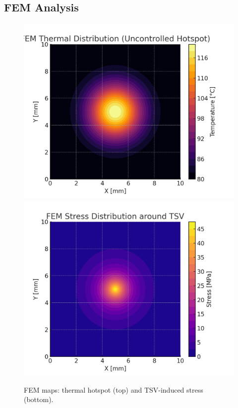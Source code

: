 \documentclass[conference]{IEEEtran}
\begin{document}
\subsection{FEM Analysis}
\begin{figure}[!t]
\centering
\includegraphics[width=.95\columnwidth]{figs/fem_thermal_map.png}\\[2mm]
\includegraphics[width=.95\columnwidth]{figs/fem_stress_map.png}
\caption{FEM maps: thermal hotspot (top) and TSV-induced stress (bottom).}
\label{fig:fem}
\end{figure}
\end{document}
